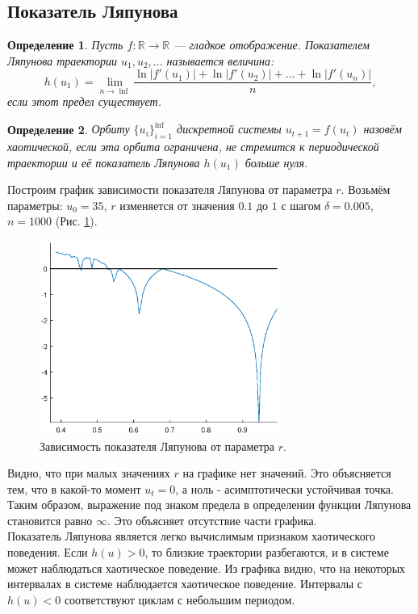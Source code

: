 \documentclass[12pt]{article}
\newtheorem{definition}{Определение}
\begin{document}
\subsection{Показатель Ляпунова}
\begin{definition}
    Пусть $f: \mathbb{R} \rightarrow \mathbb{R}$ — гладкое отображение. Показателем Ляпунова траектории $u_1, u_2, ...$ называется величина:
$$
    h(u_1) = \lim_{n \rightarrow \inf} \frac{\ln{|f'(u_1)|} + \ln{|f'(u_2)|} + ... + \ln{|f'(u_n)|}}{n},
$$
если этот предел существует.
\end{definition}
\begin{definition}
    Орбиту $\{u_i\}^{\inf}_{i=1}$ дискретной системы $u_{t+1} = f(u_t)$ назовём хаотической, если эта орбита ограничена, не стремится к периодической траектории и её показатель Ляпунова $h(u_1)$ больше нуля. \label{def:chaotic} 
\end{definition}
Построим график зависимости показателя Ляпунова от параметра $r$. Возьмём параметры: $u_0 = 35$, $r$ изменяется от значения $0.1$ до $1$ с шагом $\delta = 0.005$, $n = 1000$ (Рис. \ref{pic8}).
\begin{figure}[H]
    \begin{center}
    \includegraphics[width=0.7\textwidth]{lyapunov.eps}
    \caption{Зависимость показателя Ляпунова от параметра $r$.}
    \label{pic8}
    \end{center}
\end{figure}
Видно, что при малых значениях $r$ на графике нет значений. Это объясняется тем, что в какой-то момент $u_t = 0$, а ноль - асимптотически устойчивая точка. Таким образом, выражение под знаком предела в определении функции Ляпунова становится равно $\infty$. Это объясняет отсутствие части графика.\\
Показатель Ляпунова является легко вычислимым признаком хаотического поведения. Если $h(u) > 0$, то близкие траектории разбегаются, и в системе может наблюдаться хаотическое поведение. Из графика видно, что на некоторых интервалах в системе наблюдается хаотическое поведение. Интервалы с $h(u) < 0$ соответствуют циклам с небольшим периодом.
\end{document}
